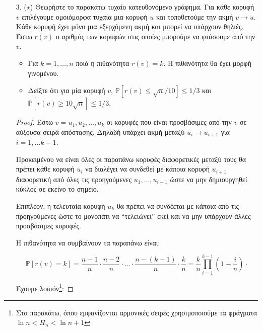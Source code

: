 \documentclass[a4paper, oneside, 11pt]{article}
\theoremstyle{definition}
\newcommand{\pr}{\mathbb{P}}
\begin{document}
\begin{enumerate}
\item[3. ($\star$)]
   Θεωρήστε το παρακάτω τυχαίο κατευθονόμενο γράφημα. Για κάθε κορυφή $v$
   επιλέγουμε ομοιόμορφα τυχαία μια κορυφή $u$ και τοποθετούμε την ακμή
   $v \rightarrow u$. Κάθε κορυφή έχει μόνο μια εξερχόμενη ακμή και μπορεί να
   υπάρχουν θηλιές. Έστω $r(v)$ ο αριθμός των κορυφών στις οποίες μπορούμε να
   φτάσουμε από την $v$.

   \begin{itemize}
      \item Για $k = 1, \ldots, n$ ποιά η πιθανότητα $r(v) = k$. Η πιθανότητα θα
            έχει μορφή γινομένου.
      \item Δείξτε ότι για μία κορυφή $v$, $\pr [ r(v) \leq \sqrt{n} / 10 ]
            \leq 1/3$ και $\pr [ r(v) \geq 10\sqrt{n} ] \leq 1/3$.
   \end{itemize}

   \begin{proof}
      Έστω $v = u_1, u_2, \ldots, u_k$ οι κορυφές που είναι προσβάσιμες από την
      $v$ σε αύξουσα σειρά απόστασης. Δηλαδή υπάρχει ακμή μεταξύ $u_i
      \rightarrow u_{i+1}$ για $i = 1, \ldots k-1$.

      Προκειμένου να είναι όλες οι παραπάνω κορυφές διαφορετικές μεταξύ τους θα
      πρέπει κάθε κορυφή $u_i$ να διαλέγει να συνδεθεί με κάποια κορυφή
      $u_{i+1}$ διαφορετική από όλες τις προηγούμενες $u_1, \ldots, u_{i-1}$
      ώστε να μην δημιουργηθεί κύκλος σε εκείνο το σημείο.

      Επιπλέον, η τελευταία κορυφή $u_k$ θα πρέπει να συνδέεται με κάποια από
      τις προηγούμενες ώστε το μονοπάτι να ``τελειώνει'' εκεί και να μην
      υπάρχουν άλλες προσβάσιμες κορυφές.

      Η πιθανότητα να συμβαίνουν τα παραπάνω είναι:

      \[ \pr[r(v) = k] = \frac{n-1}{n} \cdot \frac{n-2}{n} \cdot \ldots \cdot
         \frac{n-(k-1)}{n} \cdot \frac{k}{n} = \frac{k}{n} \prod_{i=1}^{k-1}
         \left(1 - \frac{i}{n} \right) \cdot \]

      Έχουμε λοιπόν\footnote{Στα παρακάτω, όπου εμφανίζονται αρμονικές σειρές
      χρησιμοποιούμε τα φράγματα $\ln n < H_n < \ln n + 1$}:


\end{proof}
\end{enumerate}
\end{document}
